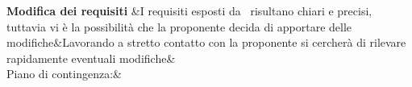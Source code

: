 \documentclass[PianoDiProgetto.tex]{subfiles}
\begin{document}
\begin{longtabu}
	 \textbf{Modifica dei requisiti} &{\small I requisiti esposti da \Proponente\ risultano chiari e precisi, tuttavia vi è la possibilità che la proponente decida di apportare delle modifiche}&{\small Lavorando a stretto contatto con la proponente si 
		cercherà di rilevare rapidamente eventuali modifiche}&  \\
	Piano di contingenza:&\\
	\hhline{====}
\end{longtabu}
\end{document}
